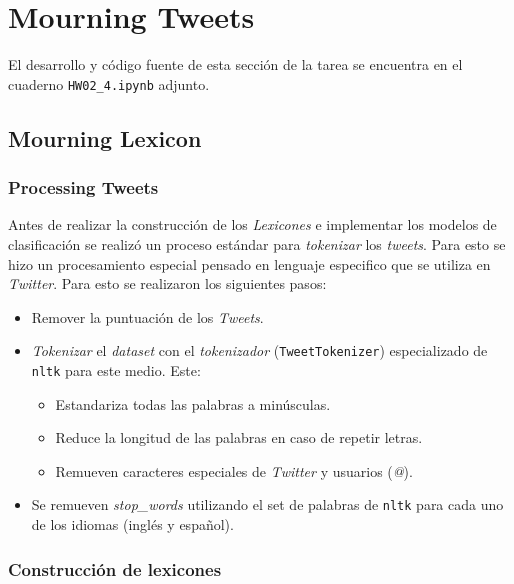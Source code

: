 \section{Mourning Tweets}

El desarrollo y código fuente de esta sección de la tarea se encuentra en el cuaderno \texttt{HW02\_4.ipynb} adjunto.

\subsection{Mourning Lexicon}

\subsubsection{Processing Tweets}

Antes de realizar la construcción de los \textit{Lexicones} e implementar los modelos de clasificación se realizó un proceso estándar para \textit{tokenizar} los \textit{tweets}. Para esto se hizo un procesamiento especial pensado en lenguaje especifico que se utiliza en \textit{Twitter}. Para esto se realizaron los siguientes pasos:

\begin{itemize}
    \item Remover la puntuación de los \textit{Tweets}.
    
    \item \textit{Tokenizar} el \textit{dataset} con el \textit{tokenizador} (\texttt{TweetTokenizer}) especializado de \texttt{nltk} para este medio. Este:
    \begin{itemize}
        \item Estandariza todas las palabras a minúsculas.
        
        \item Reduce la longitud de las palabras en caso de repetir letras.
        
        \item Remueven caracteres especiales de \textit{Twitter} y usuarios (\textit{@}).
    \end{itemize}
    
    \item Se remueven \textit{stop\_words} utilizando el set de palabras de \texttt{nltk} para cada uno de los idiomas (inglés y español).
    
\end{itemize}

\subsubsection{Construcción de lexicones}

